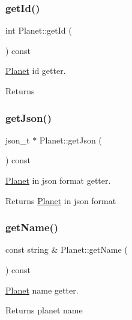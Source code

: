 \subsubsection{\texorpdfstring{get\+Id()}{getId()}}
{\footnotesize\ttfamily int Planet\+::get\+Id (\begin{DoxyParamCaption}{ }\end{DoxyParamCaption}) const}



\hyperlink{class_planet}{Planet} id getter. 

\begin{DoxyReturn}{Returns}

\end{DoxyReturn}
\mbox{\label{class_planet_accd08efab6917edf989c379b71829c21}} 
\subsubsection{\texorpdfstring{get\+Json()}{getJson()}}
{\footnotesize\ttfamily json\+\_\+t $\ast$ Planet\+::get\+Json (\begin{DoxyParamCaption}{ }\end{DoxyParamCaption}) const}



\hyperlink{class_planet}{Planet} in json format getter. 

\begin{DoxyReturn}{Returns}
\hyperlink{class_planet}{Planet} in json format 
\end{DoxyReturn}
\mbox{\label{class_planet_a2734577beb825016099903df6152e1f1}} 
\subsubsection{\texorpdfstring{get\+Name()}{getName()}}
{\footnotesize\ttfamily const string \& Planet\+::get\+Name (\begin{DoxyParamCaption}{ }\end{DoxyParamCaption}) const}



\hyperlink{class_planet}{Planet} name getter. 

\begin{DoxyReturn}{Returns}
planet name 
\end{DoxyReturn}
\mbox{\label{class_planet_aad9d8d1f969bdc086f8983cb31cb351f}} 
